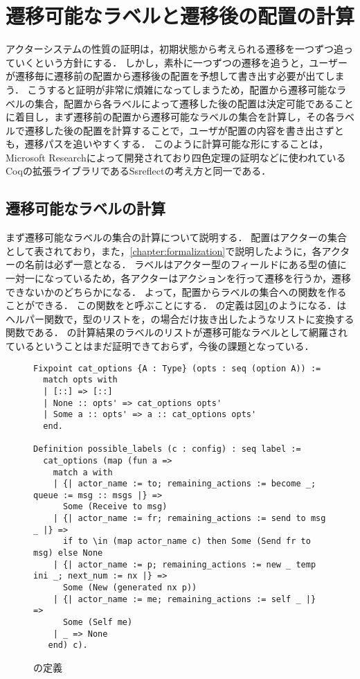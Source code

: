 \section{遷移可能なラベルと遷移後の配置の計算}

アクターシステムの性質の証明は，初期状態から考えられる遷移を一つずつ追っていくという方針にする．
しかし，素朴に一つずつの遷移を追うと，ユーザーが遷移毎に遷移前の配置から遷移後の配置を予想して書き出す必要が出てしまう．
こうすると証明が非常に煩雑になってしまうため，配置から遷移可能なラベルの集合，配置から各ラベルによって遷移した後の配置は決定可能であることに着目し，まず遷移前の配置から遷移可能なラベルの集合を計算し，その各ラベルで遷移した後の配置を計算することで，ユーザが配置の内容を書き出さずとも，遷移パスを追いやすくする．
このように計算可能な形にすることは，Microsoft Researchによって開発されており四色定理の証明などに使われているCoqの拡張ライブラリであるSsreflect\cite{ssreflect}の考え方と同一である．

\subsection{遷移可能なラベルの計算}

まず遷移可能なラベルの集合の計算について説明する．
配置はアクターの集合として表されており，また，\ref{chapter:formalization}で説明したように，各アクターの名前は必ず一意となる．
ラベルはアクター型のフィールドにある型の値に一対一になっているため，各アクターはアクションを行って遷移を行うか，遷移できないかのどちらかになる．
よって，配置からラベルの集合への関数を作ることができる．
この関数をと呼ぶことにする．
の定義は図\ref{code:proof:possible-labels}のようになる．はヘルパー関数で，型のリストを，の場合だけ抜き出したようなリストに変換する関数である．
の計算結果のラベルのリストが遷移可能なラベルとして網羅されているということはまだ証明できておらず，今後の課題となっている．


\begin{figure}
\begin{lstlisting}
Fixpoint cat_options {A : Type} (opts : seq (option A)) :=
  match opts with
  | [::] => [::]
  | None :: opts' => cat_options opts'
  | Some a :: opts' => a :: cat_options opts'
  end.

Definition possible_labels (c : config) : seq label :=
  cat_options (map (fun a =>
    match a with
    | {| actor_name := to; remaining_actions := become _; queue := msg :: msgs |} =>
      Some (Receive to msg)
    | {| actor_name := fr; remaining_actions := send to msg _ |} =>
      if to \in (map actor_name c) then Some (Send fr to msg) else None
    | {| actor_name := p; remaining_actions := new _ temp ini _; next_num := nx |} =>
      Some (New (generated nx p))
    | {| actor_name := me; remaining_actions := self _ |} =>
      Some (Self me)
    | _ => None
   end) c).
\end{lstlisting}
\label{code:proof:possible-labels}
\caption{の定義}
\end{figure}

